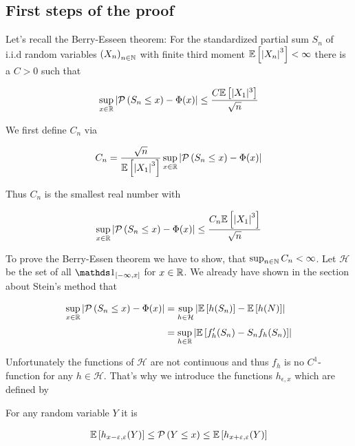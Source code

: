 \subsection{First steps of the proof}

Let's recall the Berry-Esseen theorem: For the standardized partial sum $S_n$ of i.i.d random variables $\left({X_n}\right)_{{n}\in\mathbb N}$ with finite third moment $\mathbb E\left[{\left|{X_n}\right|^3}\right]<\infty$ there is a $C > 0$ such that

\begin{align}
  \sup_{x\in\mathbb R} \left|{\mathcal P\left({S_n\le x}\right)-\Phi(x)}\right| \le \frac{C \mathbb E\left[{|X_1|^3}\right]}{\sqrt n}
\end{align}

\noindent We first define $C_n$ via

\begin{align}
  C_n = \frac{\sqrt{n}}{\mathbb E\left[{\left|{X_1}\right|^3}\right]} \sup_{x\in\mathbb R} \left|{\mathcal P\left({S_n \le x}\right)-\Phi(x)}\right|
\end{align}

\noindent Thus $C_n$ is the smallest real number with

\begin{align}
  \sup_{x\in\mathbb R}\left|{\mathcal P\left({S_n\le x}\right) - \Phi(x)}\right| \le \frac{C_n\mathbb E\left[{\left|{X_1}\right|^3}\right]}{\sqrt{n}}
\end{align}

To prove the Berry-Essen theorem we have to show, that $\sup_{n\in\mathbb N} C_n < \infty$. Let $\mathcal H$ be the set of all $\cfs{x}$ for $x\in\mathbb R$. We already have shown in the section about Stein's method that

\begin{align}
  \sup_{x\in\R}\abs{\P{S_n\le x} - \Phi(x)} & = \sup_{h\in\mathcal H} \abs{\E{h(S_n)}-\E{h(N)}} \nl
  &= \sup_{h\in\R} \abs{\E{f_h'(S_n)-S_n f_h(S_n)}}
\end{align}

Unfortunately the functions of $\mathcal H$ are not continuous and thus $f_h$ is no $C^1$-function for any $h\in \mathcal H$. That's why we introduce the functions $h_{\epsilon,x}$ which are defined by


\noindent For any random variable $Y$ it is

\begin{align} \label{berryproof:inequality1}
  \mathbb E\left[{h_{x-\varepsilon,\varepsilon}(Y)}\right] \le \mathcal P\left({Y \le x}\right) \le \mathbb E\left[{h_{x+\varepsilon,\varepsilon}(Y)}\right]
\end{align}

